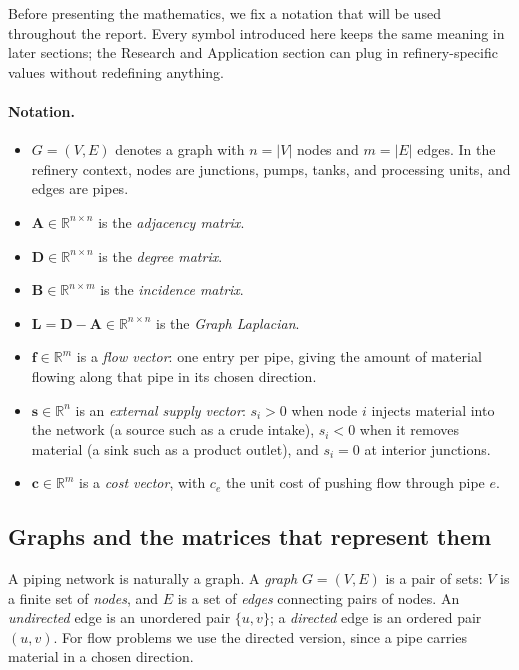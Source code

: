 \documentclass[11pt,a4paper]{article}
\newcommand{\RR}{\mathbb{R}}
\newcommand{\mat}[1]{\mathbf{#1}}
\newcommand{\vect}[1]{\mathbf{#1}}
\begin{document}
Before presenting the mathematics, we fix a notation that will be used
throughout the report. Every symbol introduced here keeps the same
meaning in later sections; the Research and Application section can
plug in refinery-specific values without redefining anything.

\paragraph{Notation.}
\begin{itemize}
  \item $G = (V, E)$ denotes a graph with $n = |V|$ nodes and
        $m = |E|$ edges. In the refinery context, nodes are
        junctions, pumps, tanks, and processing units, and edges are
        pipes.
  \item $\mat{A} \in \RR^{n \times n}$ is the \emph{adjacency matrix}.
  \item $\mat{D} \in \RR^{n \times n}$ is the \emph{degree matrix}.
  \item $\mat{B} \in \RR^{n \times m}$ is the \emph{incidence matrix}.
  \item $\mat{L} = \mat{D} - \mat{A} \in \RR^{n \times n}$ is the
        \emph{Graph Laplacian}.
  \item $\vect{f} \in \RR^{m}$ is a \emph{flow vector}: one entry per
        pipe, giving the amount of material flowing along that pipe in
        its chosen direction.
  \item $\vect{s} \in \RR^{n}$ is an \emph{external supply vector}:
        $s_i > 0$ when node $i$ injects material into the network (a
        source such as a crude intake), $s_i < 0$ when it removes
        material (a sink such as a product outlet), and $s_i = 0$ at
        interior junctions.
  \item $\vect{c} \in \RR^{m}$ is a \emph{cost vector}, with $c_e$ the
        unit cost of pushing flow through pipe $e$.
\end{itemize}

\subsection{Graphs and the matrices that represent them}
\label{sec:graphs}

A piping network is naturally a graph. A \emph{graph} $G = (V, E)$ is a
pair of sets: $V$ is a finite set of \emph{nodes}, and $E$ is a set of
\emph{edges} connecting pairs of nodes. An \emph{undirected} edge is an
unordered pair $\{u, v\}$; a \emph{directed} edge is an ordered pair
$(u, v)$. For flow problems we use the directed version, since a pipe
carries material in a chosen direction.
\end{document}
